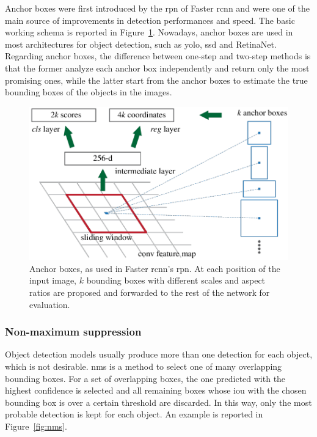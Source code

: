 \documentclass[%
    corpo=12pt,
    twoside,
    stile=classica,   
    tipotesi=magistrale,
    evenboxes,
    english,
	numerazioneromana,
]{toptesi}
\begin{document}
Anchor boxes were first introduced by the \gls{rpn} of Faster \gls{rcnn} and were one of the main source of improvements in detection performances and speed\cite{ren2016faster}. The basic working schema is reported in Figure~\ref{fig:rpn}. Nowadays, anchor boxes are used in most architectures for object detection, such as \gls{yolo}, \gls{ssd} and RetinaNet. Regarding anchor boxes, the difference between one-step and two-step methods is that the former analyze each anchor box independently and return only the most promising ones, while the latter start from the anchor boxes to estimate the true bounding boxes of the objects in the images.

\begin{figure}[tb]
	\centering
	\includegraphics[width=.7\linewidth]{imgs/rpn.png}
	\caption{Anchor boxes, as used in Faster \gls{rcnn}'s \gls{rpn}\cite{ren2016faster}. At each position of the input image, $k$ bounding boxes with different scales and aspect ratios are proposed and forwarded to the rest of the network for evaluation.}
	\label{fig:rpn}
\end{figure}

\subsubsection{Non-maximum suppression}
Object detection models usually produce more than one detection for each object, which is not desirable. \Gls{nms} is a method to select one of many overlapping bounding boxes. For a set of overlapping boxes, the one predicted with the highest confidence is selected and all remaining boxes whose \gls{iou} with the chosen bounding box is over a certain threshold are discarded. In this way, only the most probable detection is kept for each object. An example is reported in Figure~\ref{fig:nms}.
\end{document}
